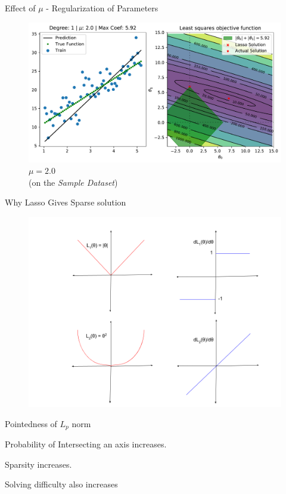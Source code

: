 \documentclass{beamer}
\begin{document}
\begin{frame}{Effect of $\mu$ - Regularization of Parameters}
\vspace{0.4cm}
\begin{figure}\includegraphics[width=0.9\linewidth]{Lasso/lasso_2.0.pdf}\caption{$\mu = 2.0$\\(on the \emph{Sample Dataset})}
\end{figure}
\end{frame}

\begin{frame}{Why Lasso Gives Sparse solution}
\begin{figure}
    \centering
    \includegraphics[scale = 0.4]{Lasso/lasso_3.png}
    \label{fig:my_label}
\end{figure}
\begin{itemize}
\small{
    \item Pointedness of $L_{p}$ norm 
    \item  Probability of Intersecting an axis increases.
    \item Sparsity increases. 
    \item Solving difficulty also increases
    }
\end{itemize}

\end{frame}
\end{document}
